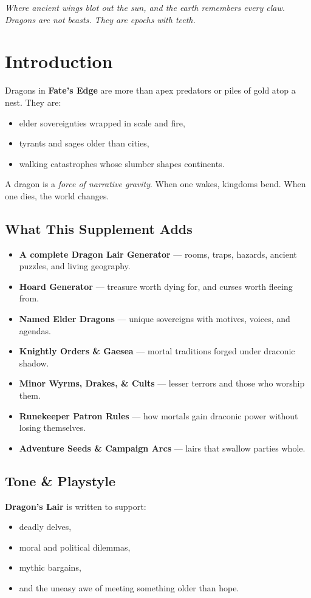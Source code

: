 \documentclass[11pt,letterpaper]{article}
\newcommand{\sectionheader}[1]{\section*{#1}}
\newcommand{\subsectionheader}[1]{\subsection*{#1}}
\begin{document}


\begin{center}
\emph{Where ancient wings blot out the sun, and the earth remembers every claw.\\
Dragons are not beasts. They are epochs with teeth.}
\end{center}

\vspace{2em}

\sectionheader{Introduction}

Dragons in \textbf{Fate's Edge} are more than apex predators or piles of gold atop a nest. They are:
\begin{itemize}[leftmargin=*]
\item elder sovereignties wrapped in scale and fire,
\item tyrants and sages older than cities,
\item walking catastrophes whose slumber shapes continents.
\end{itemize}

A dragon is a \emph{force of narrative gravity}. When one wakes, kingdoms bend.  
When one dies, the world changes.

\subsectionheader{What This Supplement Adds}
\begin{itemize}[leftmargin=*]
\item \textbf{A complete Dragon Lair Generator} --- rooms, traps, hazards, ancient puzzles, and living geography.
\item \textbf{Hoard Generator} --- treasure worth dying for, and curses worth fleeing from.
\item \textbf{Named Elder Dragons} --- unique sovereigns with motives, voices, and agendas.
\item \textbf{Knightly Orders \& Gaesea} --- mortal traditions forged under draconic shadow.
\item \textbf{Minor Wyrms, Drakes, \& Cults} --- lesser terrors and those who worship them.
\item \textbf{Runekeeper Patron Rules} --- how mortals gain draconic power without losing themselves.
\item \textbf{Adventure Seeds \& Campaign Arcs} --- lairs that swallow parties whole.
\end{itemize}

\subsectionheader{Tone \& Playstyle}

\textbf{Dragon's Lair} is written to support:
\begin{itemize}[leftmargin=*]
\item deadly delves,
\item moral and political dilemmas,
\item mythic bargains,
\item and the uneasy awe of meeting something older than hope.
\end{itemize}
\end{document}

